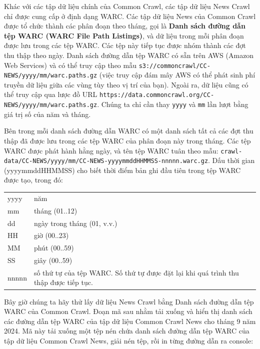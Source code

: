Khác với các tập dữ liệu chính của Common Crawl, các tập dữ liệu News Crawl chỉ được cung cấp ở định dạng WARC. Các tập dữ liệu News của Common Crawl được tổ chức thành các phân đoạn theo tháng, gọi là \textbf{Danh sách đường dẫn tệp WARC (WARC File Path Listings)}, và dữ liệu trong mỗi phân đoạn được lưu trong các tệp WARC. Các tệp này tiếp tục được nhóm thành các đợt thu thập theo ngày. Danh sách đường dẫn tệp WARC có sẵn trên AWS (Amazon Web Services) và có thể truy cập theo mẫu \texttt{s3://commoncrawl/CC-NEWS/yyyy/mm/warc.paths.gz} (việc truy cập đám mây AWS có thể phát sinh phí truyền dữ liệu giữa các vùng tùy theo vị trí của bạn). Ngoài ra, dữ liệu cũng có thể truy cập qua lược đồ URL \texttt{https://data.commoncrawl.org/CC-NEWS/yyyy/mm/warc.paths.gz}. Chúng ta chỉ cần thay \texttt{yyyy} và \texttt{mm} lần lượt bằng giá trị số của năm và tháng.

Bên trong mỗi danh sách đường dẫn WARC có một danh sách tất cả các đợt thu thập đã được lưu trong các tệp WARC của phân đoạn này trong tháng. Các tệp WARC được phát hành hằng ngày, và tên tệp WARC tuân theo mẫu: \texttt{crawl-data/CC-NEWS/yyyy/mm/CC-NEWS-yyyymmddHHMMSS-nnnnn.warc.gz}. Dấu thời gian (yyyymmddHHMMSS) cho biết thời điểm bản ghi đầu tiên trong tệp WARC được tạo, trong đó:

{\small
\begin{longtable}[]{@{}
  >{\raggedright\arraybackslash}p{}
  >{\raggedright\arraybackslash}p{}@{}}
\toprule\noalign{}
\endhead
\bottomrule\noalign{}
\endlastfoot
yyyy & năm \\
mm & tháng (01..12) \\
dd & ngày trong tháng (01, v.v.) \\
HH & giờ (00..23) \\
MM & phút (00..59) \\
SS & giây (00..59) \\
nnnnn & số thứ tự của tệp WARC. Số thứ tự được đặt lại khi quá trình thu thập được tiếp tục. \\
\end{longtable}
}

Bây giờ chúng ta hãy thử lấy dữ liệu News Crawl bằng Danh sách đường dẫn tệp WARC của Common Crawl. Đoạn mã sau nhằm tải xuống và hiển thị danh sách các đường dẫn tệp WARC của tập dữ liệu Common Crawl News cho tháng 9 năm 2024. Mã này tải xuống một tệp nén chứa danh sách đường dẫn tệp WARC của tập dữ liệu Common Crawl News, giải nén tệp, rồi in từng đường dẫn ra console:

